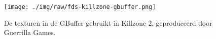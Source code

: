\begin{figure}
  \centering
  \texttt{[image: ./img/raw/fds-killzone-gbuffer.png]}
  \caption{De texturen in de GBuffer gebruikt in Killzone 2, geproduceerd door Guerrilla Games\cite{valient2009rendering}.}
  \label{fig:fds-gbuffer}
\end{figure}
